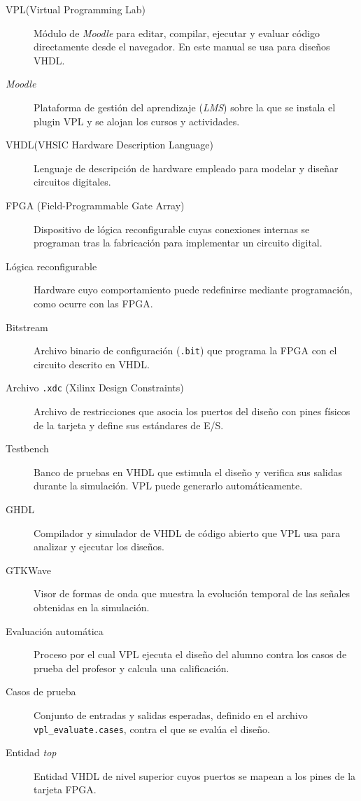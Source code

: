\documentclass[12pt, a4paper, twoside, openany]{book}
\newcommand{\vpl}{\textsc{VPL}\xspace}
\newcommand{\vhdl}{\textsc{VHDL}\xspace}
\newcommand{\moodle}{\textit{Moodle}\xspace}
\begin{document}
\begin{description}
  \item[\vpl (Virtual Programming Lab)] Módulo de \moodle para editar,
        compilar, ejecutar y evaluar código directamente desde el navegador.
        En este manual se usa para diseños \vhdl.
  \item[\moodle] Plataforma de gestión del aprendizaje (\textit{LMS}) sobre la
        que se instala el plugin \vpl y se alojan los cursos y actividades.
  \item[\vhdl (VHSIC Hardware Description Language)] Lenguaje de descripción de
        hardware empleado para modelar y diseñar circuitos digitales.
  \item[FPGA (Field-Programmable Gate Array)] Dispositivo de lógica
        reconfigurable cuyas conexiones internas se programan tras la
        fabricación para implementar un circuito digital.
  \item[Lógica reconfigurable] Hardware cuyo comportamiento puede redefinirse
        mediante programación, como ocurre con las FPGA.
  \item[Bitstream] Archivo binario de configuración (\texttt{.bit}) que
        programa la FPGA con el circuito descrito en \vhdl.
  \item[Archivo \texttt{.xdc} (Xilinx Design Constraints)] Archivo de
        restricciones que asocia los puertos del diseño con pines físicos de
        la tarjeta y define sus estándares de E/S.
  \item[Testbench] Banco de pruebas en \vhdl que estimula el diseño y verifica
        sus salidas durante la simulación. \vpl puede generarlo
        automáticamente.
  \item[GHDL] Compilador y simulador de \vhdl de código abierto que \vpl usa
        para analizar y ejecutar los diseños.
  \item[GTKWave] Visor de formas de onda que muestra la evolución temporal de
        las señales obtenidas en la simulación.
  \item[Evaluación automática] Proceso por el cual \vpl ejecuta el diseño del
        alumno contra los casos de prueba del profesor y calcula una
        calificación.
  \item[Casos de prueba] Conjunto de entradas y salidas esperadas, definido en
        el archivo \texttt{vpl\_evaluate.cases}, contra el que se evalúa el
        diseño.
  \item[Entidad \textit{top}] Entidad \vhdl de nivel superior cuyos puertos se
        mapean a los pines de la tarjeta FPGA.

\end{description}
\end{document}
